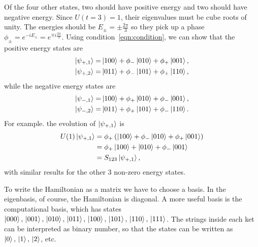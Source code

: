 Of the four other states, two should have positive energy and two should have negative energy. Since $U(t=3)=1$, their eigenvalues must be cube roots of unity. The energies should be $E_\pm = \pm\frac{2\pi}{3}$ so they pick up a phase $\phi_\pm =e^{-iE_\pm} = e^{\mp i\frac{2\pi}{3}}$. Using condition~\ref{eqn:condition}, we can show that the positive energy states are
\begin{align}
\left|\psi_{+,1}\right\rangle=&\left|100\right\rangle + \phi_-\left|010\right\rangle + \phi_+\left|001\right\rangle,\nonumber\\
\left|\psi_{+,2}\right\rangle=&\left|011\right\rangle + \phi_-\left|101\right\rangle + \phi_+\left|110\right\rangle,\label{eqn:plus}
\end{align}
while the negative energy states are 
\begin{align}
\left|\psi_{-,1}\right\rangle=&\left|100\right\rangle + \phi_+\left|010\right\rangle + \phi_-\left|001\right\rangle,\nonumber\\
\left|\psi_{-,2}\right\rangle=&\left|011\right\rangle + \phi_+\left|101\right\rangle + \phi_-\left|110\right\rangle.\label{eqn:min}
\end{align}
For example. the evolution of $\left|\psi_{+,1}\right\rangle$ is
\begin{align}
U(1)\left|\psi_{+,1}\right\rangle &= \phi_+ \left(\left|100\right\rangle + \phi_-\left|010\right\rangle + \phi_+
	\left|001\right\rangle\right)\nonumber\\
&= \phi_+\left|100\right\rangle + \left|010\right\rangle +\phi_- \left|001\right\rangle\nonumber\\
&= S_{123}\left|\psi_{+,1}\right\rangle,
\end{align}
with similar results for the other 3 non-zero energy states.

To write the Hamiltonian as a matrix we have to choose a basis. In the eigenbasis, of course, the Hamiltonian is diagonal. A more useful basis is the computational basis, which has states $\left|000\right\rangle,\,\left|001\right\rangle,\,\left|010\right\rangle,\,\left|011\right\rangle,\,\left|100\right\rangle,\,\left|101\right\rangle,\,\left|110\right\rangle,\,\left|111\right\rangle$. The strings inside each ket can be interpreted as binary number, so that the states can be written as $\left|0\right\rangle,\,\left|1\right\rangle,\,\left|2\right\rangle$, etc.

